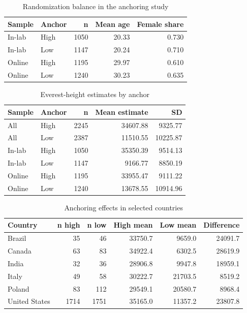 \documentclass[12pt]{article}
\begin{document}
\begin{table}[H]
\centering
\caption{Randomization balance in the anchoring study}\label{tab:anchoring-balance}
\begin{tabular}{llrrr}
\toprule
\textbf{Sample} & \textbf{Anchor} & \textbf{n} & \textbf{Mean age} & \textbf{Female share} \\
\midrule
In-lab & High & 1050 & 20.33 & 0.730 \\
In-lab & Low & 1147 & 20.24 & 0.710 \\
Online & High & 1195 & 29.97 & 0.610 \\
Online & Low & 1240 & 30.23 & 0.635 \\
\bottomrule
\end{tabular}
\end{table}

\begin{table}[H]
\centering
\caption{Everest-height estimates by anchor}\label{tab:anchoring-outcomes}
\begin{tabular}{llrrr}
\toprule
\textbf{Sample} & \textbf{Anchor} & \textbf{n} & \textbf{Mean estimate} & \textbf{SD} \\
\midrule
All & High & 2245 & 34607.88 & 9325.77 \\
All & Low & 2387 & 11510.55 & 10225.87 \\
In-lab & High & 1050 & 35350.39 & 9514.13 \\
In-lab & Low & 1147 & 9166.77 & 8850.19 \\
Online & High & 1195 & 33955.47 & 9111.22 \\
Online & Low & 1240 & 13678.55 & 10914.96 \\
\bottomrule
\end{tabular}
\end{table}

\begin{table}[H]
\centering
\caption{Anchoring effects in selected countries}\label{tab:anchoring-countries}
\begin{tabular}{lrrrrr}
\toprule
\textbf{Country} & \textbf{n high} & \textbf{n low} & \textbf{High mean} & \textbf{Low mean} & \textbf{Difference} \\
\midrule
Brazil & 35 & 46 & 33750.7 & 9659.0 & 24091.7 \\
Canada & 63 & 83 & 34922.4 & 6302.5 & 28619.9 \\
India & 32 & 36 & 28906.8 & 9947.8 & 18959.1 \\
Italy & 49 & 58 & 30222.7 & 21703.5 & 8519.2 \\
Poland & 83 & 112 & 29549.1 & 20580.7 & 8968.4 \\
United States & 1714 & 1751 & 35165.0 & 11357.2 & 23807.8 \\
\bottomrule
\end{tabular}
\end{table}
\end{document}
